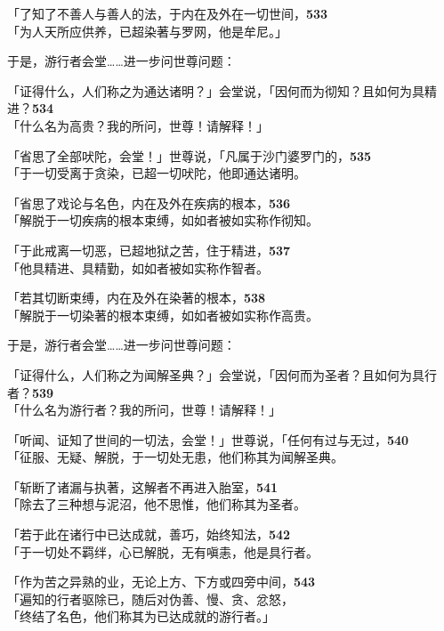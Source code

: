 「了知了不善人与善人的法，于内在及外在一切世间，\hfill{\grayfootnotesize \textbf{533}} \\
「为人天所应供养，已超染著与罗网，他是牟尼。」


于是，游行者会堂……进一步问世尊问题：

「证得什么，人们称之为通达诸明？」会堂说，「因何而为彻知？且如何为具精进？\hfill{\grayfootnotesize \textbf{534}} \\
「什么名为高贵？我的所问，世尊！请解释！」

「省思了全部吠陀，会堂！」世尊说，「凡属于沙门婆罗门的，\hfill{\grayfootnotesize \textbf{535}} \\
「于一切受离于贪染，已超一切吠陀，他即通达诸明。


「省思了戏论与名色，内在及外在疾病的根本，\hfill{\grayfootnotesize \textbf{536}} \\
「解脱于一切疾病的根本束缚，如如者被如实称作彻知。


「于此戒离一切恶，已超地狱之苦，住于精进，\hfill{\grayfootnotesize \textbf{537}} \\
「他具精进、具精勤，如如者被如实称作智者。


「若其切断束缚，内在及外在染著的根本，\hfill{\grayfootnotesize \textbf{538}} \\
「解脱于一切染著的根本束缚，如如者被如实称作高贵。


于是，游行者会堂……进一步问世尊问题：

「证得什么，人们称之为闻解圣典？」会堂说，「因何而为圣者？且如何为具行者？\hfill{\grayfootnotesize \textbf{539}} \\
「什么名为游行者？我的所问，世尊！请解释！」

「听闻、证知了世间的一切法，会堂！」世尊说，「任何有过与无过，\hfill{\grayfootnotesize \textbf{540}} \\
「征服、无疑、解脱，于一切处无患，他们称其为闻解圣典。


「斩断了诸漏与执著，这解者不再进入胎室，\hfill{\grayfootnotesize \textbf{541}} \\
「除去了三种想与泥沼，他不思惟，他们称其为圣者。


「若于此在诸行中已达成就，善巧，始终知法，\hfill{\grayfootnotesize \textbf{542}} \\
「于一切处不羁绊，心已解脱，无有嗔恚，他是具行者。


「作为苦之异熟的业，无论上方、下方或四旁中间，\hfill{\grayfootnotesize \textbf{543}} \\
「遍知的行者驱除已，随后对伪善、慢、贪、忿怒，\\
「终结了名色，他们称其为已达成就的游行者。」


